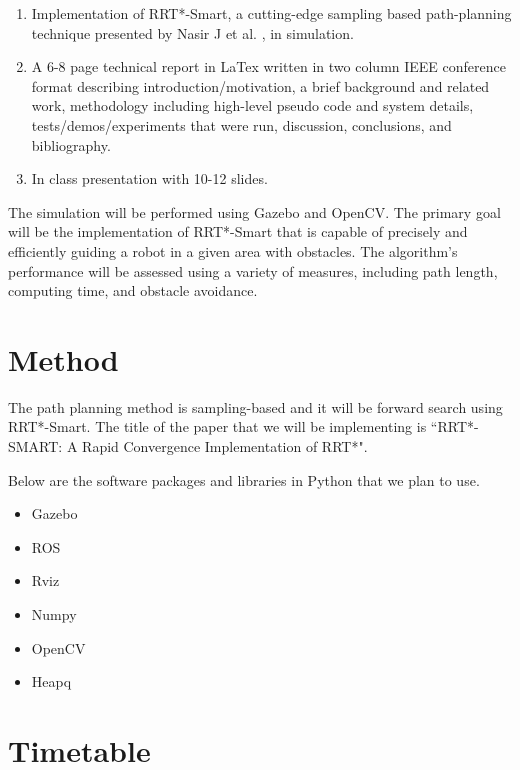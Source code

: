 \documentclass[12pt]{extarticle}
\begin{document}
\begin{enumerate}
	\item Implementation of RRT*-Smart, a cutting-edge sampling based path-planning technique presented by Nasir J et al. \cite{Jau}, in simulation.
	\item A 6-8 page technical report in LaTex written in two column IEEE conference format describing introduction/motivation, a brief background and related work, methodology including high-level pseudo code and system details, tests/demos/experiments that were run, discussion, conclusions, and bibliography.
	\item In class presentation with 10-12 slides.
\end{enumerate}

The simulation will be performed using Gazebo and OpenCV. The primary goal will be the implementation of RRT*-Smart that is capable of precisely and efficiently guiding a robot in a given area with obstacles. The algorithm's performance will be assessed using a variety of measures, including path length, computing time, and obstacle avoidance.
\section{Method}
\hspace{\parindent}The path planning method is sampling-based and it will be forward search using RRT*-Smart. The title of the paper that we will be implementing is ``RRT*-SMART: A Rapid Convergence Implementation of RRT*".

Below are the software packages and libraries in Python that we plan to use.
\begin{itemize}
	\item Gazebo
	\item ROS
	\item Rviz
	\item Numpy
	\item OpenCV
	\item Heapq
\end{itemize}
\section{Timetable}
\end{document}
